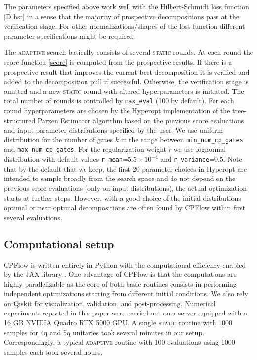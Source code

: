 \documentclass[twocolumn, amsfonts, amssymb, aps, nofootinbib]{revtex4-2}
\newcommand{\package}[1]{\textrm {#1 }}
\newcommand{\cpflow}{\package{CPFlow}}
\newcommand{\static}{\textsc{static }}
\newcommand{\adaptive}{\textsc{adaptive }}
\newcommand{\param}[1]{\texttt{#1}}
\begin{document}
The parameters specified above work well with the Hilbert-Schmidt loss function \eqref{D hst} in a sense that the majority of prospective decompositions pass at the verification stage. For other normalizations/shapes of the loss function different parameter specifications might be required.

The \adaptive search basically consists of several \static rounds. At each round the score function \eqref{score}  is computed from the prospective results. If there is a prospective result that improves the current best decomposition it is verified and added to the decomposition pull if successful. Otherwise, the verification stage is omitted and a new \static round with altered hyperparameters is initiated. The total number of rounds is controlled by \param{max\_eval} (100 by default). For each round hyperparameters are chosen by the \package{Hyperopt} implementation of the tree-structured Parzen Estimator algorithm \cite{hyperopt} based on the previous score evaluations and input parameter distributions specified by the user. We use uniform distribution for the number of gates $k$ in the range between \param{min\_num\_cp\_gates} and \param{max\_num\_cp\_gates}. For the regularization weight $r$ we use lognormal distribution with default values \param{r\_mean}=$5.5\times10^{-4}$ and \param{r\_variance}=0.5. Note that by the default that we keep, the first 20 parameter choices in Hyperopt are intended to sample broadly from the search space and do not depend on the previous score evaluations (only on input distributions), the actual optimization starts at further steps. However, with a good choice of the initial distributions optimal or near optimal decompositions are often found by \cpflow within first several evaluations.
\subsection{Computational setup \label{server}}
\cpflow is written entirely in Python with the computational efficiency enabled by the \package{JAX} library \cite{jax2018github}. One advantage of \cpflow is that the computations are highly parallelizable as the core of both basic routines consists in performing independent optimizations starting from different initial conditions. We also rely on \package{Qiskit} \cite{Qiskit} for visualization, validation, and post-processing. Numerical experiments reported in this paper  were carried out on a server equipped with a 16 GB NVIDIA Quadro RTX 5000 GPU. A single \static routine with 1000 samples for 4q and 5q unitaries took several minutes in our setup.  Correspondingly, a typical \adaptive routine with 100 evaluations using 1000 samples each took several hours. 
\end{document}
